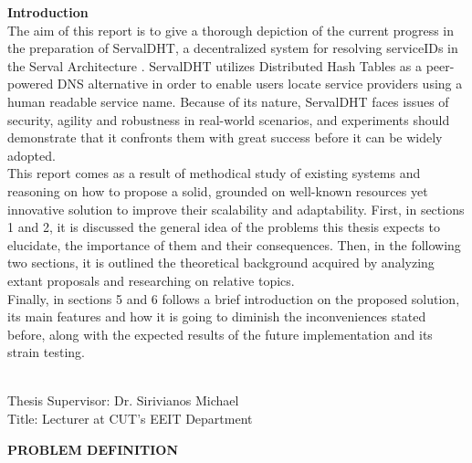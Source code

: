 \documentclass[12pt,a4paper,oneside]{article}
\begin{document}
{\Large \bf \noindent Introduction} \\[0.5cm]
The aim of this report is to give a thorough depiction of the current progress in the preparation of ServalDHT, a decentralized system for resolving serviceIDs in the Serval Architecture \cite{Nordstrom2012}.
ServalDHT utilizes Distributed Hash Tables  as a peer-powered DNS   alternative in order to enable users locate service providers using a human readable service name.
Because of its nature, ServalDHT faces issues of security, agility and robustness in real-world scenarios, and experiments should demonstrate that it confronts them with great success before it can be widely adopted.\\
\indent This report comes as a result of methodical study of existing systems and reasoning on how to propose a solid, grounded on well-known resources yet innovative solution to improve their scalability and adaptability.
First, in sections 1 and 2, it is discussed the general idea of the problems this thesis expects to elucidate, the importance of them and their consequences.
Then, in the following two sections, it is outlined the theoretical background acquired by analyzing extant proposals and researching on relative topics.\\
\indent Finally, in sections 5 and 6 follows a brief introduction on the proposed solution, its main features and how it is going to diminish the inconveniences stated before, along with the expected results of the future implementation and its strain testing.

~\\[0.5cm]
{\large
\noindent Thesis Supervisor: Dr. Sirivianos Michael\\
\noindent Title: Lecturer at CUT's EEIT Department}


\newpage
\thispagestyle{empty}
{}
{\Huge \bf \noindent PROBLEM DEFINITION}
\newpage


\newpage
\end{document}
